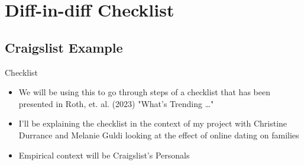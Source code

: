 \documentclass{beamer}
\begin{document}



\section{Diff-in-diff Checklist}

\subsection{Craigslist Example}

\begin{frame}{Checklist}

\begin{itemize}

\item We will be using this to go through steps of a checklist that has been presented in Roth, et. al. (2023) "What's Trending \dots"
\item I'll be explaining the checklist in the context of my project with Christine Durrance and Melanie Guldi looking at the effect of online dating on families
\item Empirical context will be Craigslist's Personals

\end{itemize}

\end{frame}
\end{document}
